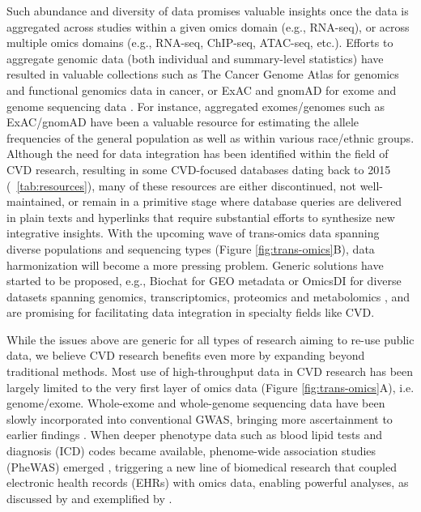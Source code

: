 \documentclass[letter]{bib}
\begin{document}
	

	Such abundance and diversity of data promises valuable insights once the data is aggregated across studies within a given omics domain (e.g., RNA-seq), or across multiple omics domains (e.g., RNA-seq, ChIP-seq, ATAC-seq, etc.). Efforts to aggregate genomic data (both individual and summary-level statistics) have resulted in valuable collections such as The Cancer Genome Atlas \citep{TCGA:2013:Cancer} for genomics and functional genomics data in cancer, or ExAC and gnomAD for exome and genome sequencing data \citep{Lek:2016:Analysis}. For instance, aggregated exomes/genomes such as ExAC/gnomAD have been a valuable resource for estimating the allele frequencies of the general population as well as within various race/ethnic groups.
	Although the need for data integration has been identified within the field of CVD research, resulting in some CVD-focused databases dating back to 2015 (\tablename~\ref{tab:resources}), many of these resources are either discontinued, not well-maintained, or remain in a primitive stage where database queries are delivered in plain texts and hyperlinks that require substantial efforts to synthesize new integrative insights.
	With the upcoming wave of trans-omics data spanning diverse populations and sequencing types (Figure \ref{fig:trans-omics}B),  data harmonization will become a more pressing problem.
	Generic solutions have started to be proposed, e.g., Biochat for GEO metadata \citep{Khomtchouk:2018:Biochat} or OmicsDI for diverse datasets spanning genomics, transcriptomics, proteomics and metabolomics \citep{Perez-Riverol:2017:Discovering}, and are promising for facilitating data integration in specialty fields like CVD.
	
	While the issues above are generic for all types of research aiming to re-use public data, we believe CVD research benefits even more by expanding beyond traditional methods. Most use of high-throughput data in CVD research has been largely limited to the very first layer of omics data (Figure \ref{fig:trans-omics}A), i.e. genome/exome. Whole-exome and whole-genome sequencing data have been slowly incorporated into conventional GWAS, bringing more ascertainment to earlier findings \citep{Cohen:2006:Sequence,Dewey:2016:Inactivating,CARDIoGRAM:2016:Coding,NHLBI:2014:LossofFunction}. When deeper phenotype data such as blood lipid tests and diagnosis (ICD) codes became available, phenome-wide association studies (PheWAS) emerged \citep{Denny:2013:Systematic}, triggering a new line of biomedical research that coupled electronic health records (EHRs) with omics data, enabling powerful analyses, as discussed by  \cite{Denaxas:2015:Big, Wu:2017:Omic} and exemplified by \cite{Dewey:2016:Distribution,Li:2018:Decoding}. 
	
\end{document}
